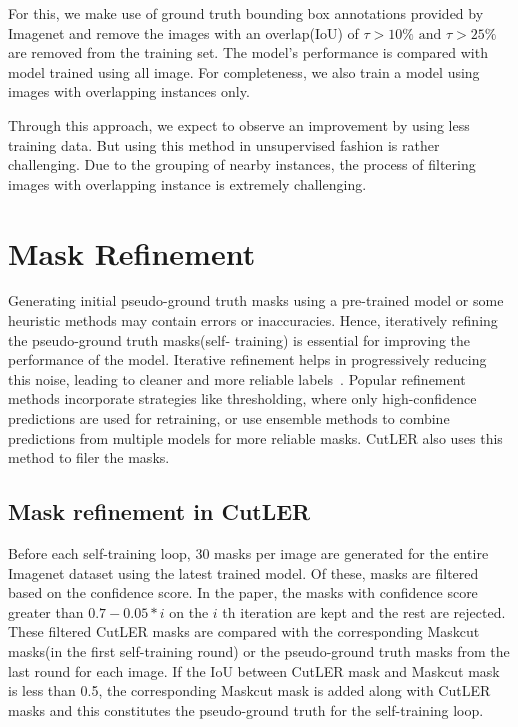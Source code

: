 For this, we make use of ground truth bounding box annotations provided by Imagenet and remove the images with an overlap(IoU) of \(\tau > \text{10\%}\text{ and }\tau > \text{25\%}\) are removed from the training set. The model's performance is compared with model trained using all image. For completeness, we also train a model using images with overlapping instances only.

Through this approach, we expect to observe an improvement by using less training data. But using this method in unsupervised fashion is rather challenging. Due to the grouping of nearby instances, the process of filtering images with overlapping instance is extremely challenging.

\section{Mask Refinement}
Generating initial pseudo-ground truth masks using a pre-trained model or some heuristic methods may contain errors or inaccuracies. Hence, iteratively refining the pseudo-ground truth masks(self- training) is essential for improving the performance of the model. Iterative refinement helps in progressively reducing this noise, leading to cleaner and more reliable labels~\cite{xie2020selftrainingnoisystudentimproves}. Popular refinement methods incorporate strategies like thresholding, where only high-confidence predictions are used for retraining, or use ensemble methods to combine predictions from multiple models for more reliable masks. CutLER also uses this method to filer the masks.

\subsection{Mask refinement in CutLER}
Before each self-training loop, 30 masks per image are generated for the entire Imagenet dataset using the latest trained model. Of these, masks are filtered based on the confidence score. In the paper, the masks with confidence score greater than \(0.7 - 0.05 * i\) on the \(i\) th iteration are kept and the rest are rejected. These filtered CutLER masks are compared with the corresponding Maskcut masks(in the first self-training round) or the pseudo-ground truth masks from the last round for each image. If the IoU between CutLER mask and Maskcut mask is less than 0.5, the corresponding Maskcut mask is added along with CutLER masks and this constitutes the pseudo-ground truth for the self-training loop.

